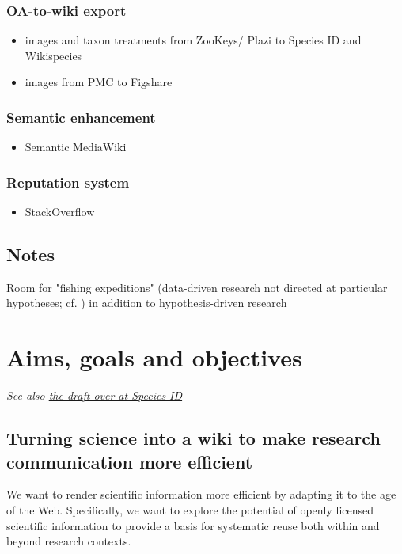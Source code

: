 \documentclass[final,authoryear,3p]{elsarticle-open-drafting}
\begin{document}
\subsubsection{OA-to-wiki export}
\begin{itemize}
	\item images and taxon treatments from ZooKeys/ Plazi to Species ID and Wikispecies
	\item images from PMC to Figshare
\end{itemize}

\subsubsection{Semantic enhancement}
\begin{itemize}
	\item Semantic MediaWiki
\end{itemize}

\subsubsection{Reputation system}
\begin{itemize}
	\item StackOverflow
\end{itemize}

\subsection{Notes}
Room for "fishing expeditions" (data-driven research not directed at particular hypotheses; cf. \href{http://dx.doi.org/10.1091/mbc.E09}{\citep{botstein2010d}}) in addition to hypothesis-driven research

\section{Aims, goals and objectives}
{\it See also \href{http://species-id.net/wiki/Draft:Encyclopaedia_of_original_research#Aims,_Goals_and_Objectives}{the draft over at Species ID}}

\subsection{Turning science into a wiki to make research communication more efficient}
We want to render scientific information more efficient by adapting it to the age of the Web. Specifically, we want to explore the potential of openly licensed scientific information to provide a basis for systematic reuse both within and beyond research contexts. 
\end{document}
